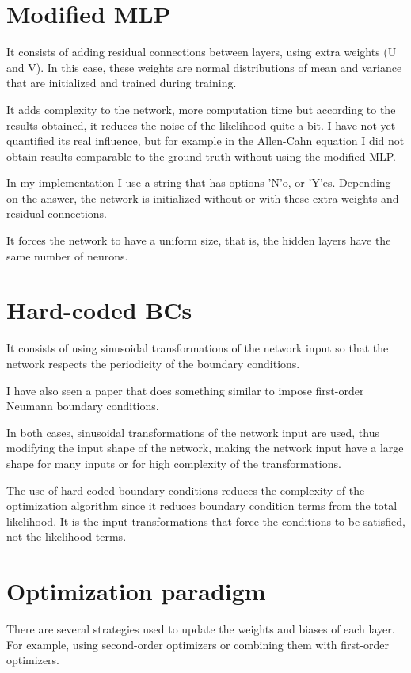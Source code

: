 \documentclass{article}
\begin{document}
\section{Modified MLP}

It consists of adding residual connections between layers, using extra weights (U and V). In this case, these weights are normal distributions of mean and variance that are initialized and trained during training.

It adds complexity to the network, more computation time but according to the results obtained, it reduces the noise of the likelihood quite a bit. I have not yet quantified its real influence, but for example in the Allen-Cahn equation I did not obtain results comparable to the ground truth without using the modified MLP.

In my implementation I use a string that has options 'N'o, or 'Y'es. Depending on the answer, the network is initialized without or with these extra weights and residual connections.

It forces the network to have a uniform size, that is, the hidden layers have the same number of neurons.

\section{Hard-coded BCs}

It consists of using sinusoidal transformations of the network input so that the network respects the periodicity of the boundary conditions.

I have also seen a paper that does something similar to impose first-order Neumann boundary conditions.

In both cases, sinusoidal transformations of the network input are used, thus modifying the input shape of the network, making the network input have a large shape for many inputs or for high complexity of the transformations.

The use of hard-coded boundary conditions reduces the complexity of the optimization algorithm since it reduces boundary condition terms from the total likelihood. It is the input transformations that force the conditions to be satisfied, not the likelihood terms.

\section{Optimization paradigm}

There are several strategies used to update the weights and biases of each layer. For example, using second-order optimizers or combining them with first-order optimizers.
\end{document}
